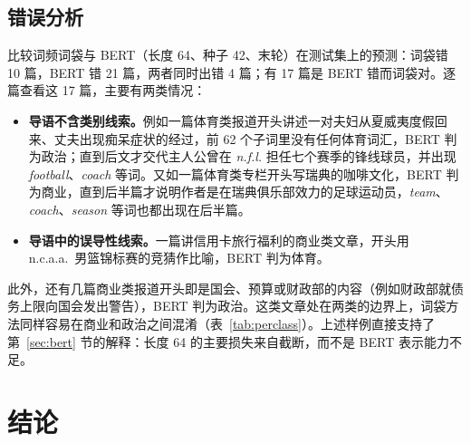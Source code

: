\documentclass[lang=cn,a4paper]{elegantpaper}
\begin{document}
\subsection{错误分析}
\label{sec:error}

比较词频词袋与 BERT（长度 64、种子 42、末轮）在测试集上的预测：词袋错 10 篇，BERT 错 21 篇，两者同时出错 4 篇；有 17 篇是 BERT 错而词袋对。逐篇查看这 17 篇，主要有两类情况：
\begin{itemize}
  \item \textbf{导语不含类别线索。}例如一篇体育类报道开头讲述一对夫妇从夏威夷度假回来、丈夫出现痴呆症状的经过，前 62 个子词里没有任何体育词汇，BERT 判为政治；直到后文才交代主人公曾在 \emph{n.f.l.} 担任七个赛季的锋线球员，并出现 \emph{football}、\emph{coach} 等词。又如一篇体育类专栏开头写瑞典的咖啡文化，BERT 判为商业，直到后半篇才说明作者是在瑞典俱乐部效力的足球运动员，\emph{team}、\emph{coach}、\emph{season} 等词也都出现在后半篇。
  \item \textbf{导语中的误导性线索。}一篇讲信用卡旅行福利的商业类文章，开头用 n.c.a.a.\ 男篮锦标赛的竞猜作比喻，BERT 判为体育。
\end{itemize}

此外，还有几篇商业类报道开头即是国会、预算或财政部的内容（例如财政部就债务上限向国会发出警告），BERT 判为政治。这类文章处在两类的边界上，词袋方法同样容易在商业和政治之间混淆（表~\ref{tab:perclass}）。上述样例直接支持了第~\ref{sec:bert} 节的解释：长度 64 的主要损失来自截断，而不是 BERT 表示能力不足。

\FloatBarrier
\section{结论}
\end{document}
